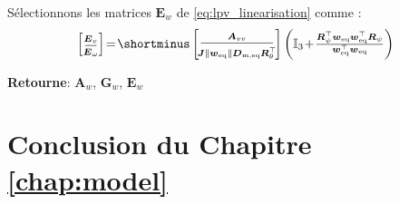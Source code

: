 \begin{algorithm}
\begin{algorithmic} [1]
        \STATE Sélectionnons les matrices $\boldsymbol{E}_w$ de \eqref{eq:lpv_linearisation} comme :
        \begin{align}
        \label{eq:Ev_alg2}
        \left[  \begin{smallmatrix}
        \! \boldsymbol{E}_{v} \rule[-0.1cm]{0cm}{0.35cm} \! \\ \hline \! \boldsymbol{E}_{\omega} \rule{0cm}{0.25cm} \!
            \end{smallmatrix} \right] \!=\! \shortminus
            \left[ \begin{smallmatrix}
            \boldsymbol{A}_{vv} \rule[-0.1cm]{0cm}{0.35cm}
            \\ \hline 
            \rule{0cm}{0.35cm}
            \!\! \boldsymbol{J} \| \boldsymbol{w}_{\mathrm{eq}} \| \boldsymbol{D}_{\text{m,eq}} \boldsymbol{R}_\theta^\top \!\! 
            \end{smallmatrix} \right]
                \left( \mathbb{I}_3 \!+\! \tfrac{
                \boldsymbol{R}_\psi^\top \boldsymbol{w}_\text{eq} \boldsymbol{w}_\text{eq}^\top \boldsymbol{R}_\psi}{\boldsymbol{w}_\text{eq}^\top \boldsymbol{w}_\text{eq}} \right)
        \end{align}

    \end{algorithmic} 
\hspace*{.1cm} \textbf{Retourne}:  $\boldsymbol{A}_{w}$, $\boldsymbol{G}_{w}$, $\boldsymbol{E}_{w}$ 
\end{algorithm}

\section{Conclusion du Chapitre \ref{chap:model}}
 
